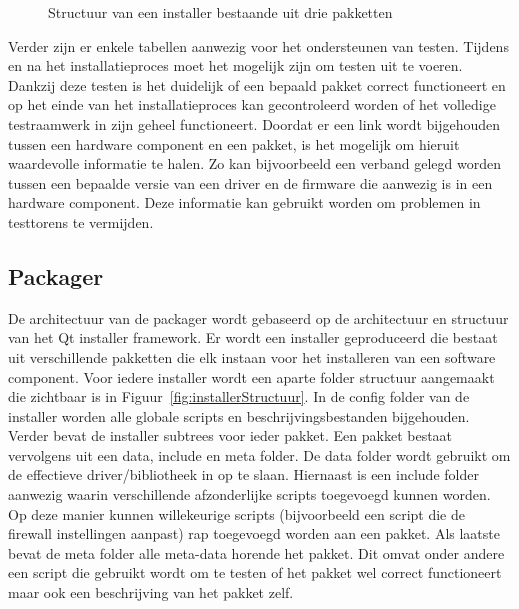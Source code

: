 \begin{figure}[!ht]
\centering
{}
\caption{Structuur van een installer bestaande uit drie pakketten}
\label{fig:installerStructuur}
\end{figure}

Verder zijn er enkele tabellen aanwezig voor het ondersteunen van testen.
Tijdens en na het installatieproces moet het mogelijk zijn om testen uit te voeren.
Dankzij deze testen is het duidelijk of een bepaald pakket correct functioneert en op het einde van het installatieproces kan gecontroleerd worden of het volledige testraamwerk in zijn geheel functioneert.
Doordat er een link wordt bijgehouden tussen een hardware component en een pakket, is het mogelijk om hieruit waardevolle informatie te halen.
Zo kan bijvoorbeeld een verband gelegd worden tussen een bepaalde versie van een driver en de firmware die aanwezig is in een hardware component.
Deze informatie kan gebruikt worden om problemen in testtorens te vermijden.

\subsection{Packager}
De architectuur van de packager wordt gebaseerd op de architectuur en structuur van het Qt installer framework.
Er wordt een installer geproduceerd die bestaat uit verschillende pakketten die elk instaan voor het installeren van een software component.
Voor iedere installer wordt een aparte folder structuur aangemaakt die zichtbaar is in Figuur~\vref{fig:installerStructuur}.
In de config folder van de installer worden alle globale scripts en beschrijvingsbestanden bijgehouden.
Verder bevat de installer subtrees voor ieder pakket.
Een pakket bestaat vervolgens uit een data, include en meta folder.
De data folder wordt gebruikt om de effectieve driver/bibliotheek in op te slaan.
Hiernaast is een include folder aanwezig waarin verschillende afzonderlijke scripts toegevoegd kunnen worden.
Op deze manier kunnen willekeurige scripts (bijvoorbeeld een script die de firewall instellingen aanpast) rap toegevoegd worden aan een pakket.
Als laatste bevat de meta folder alle meta-data horende het pakket.
Dit omvat onder andere een script die gebruikt wordt om te testen of het pakket wel correct functioneert maar ook een beschrijving van het pakket zelf.

